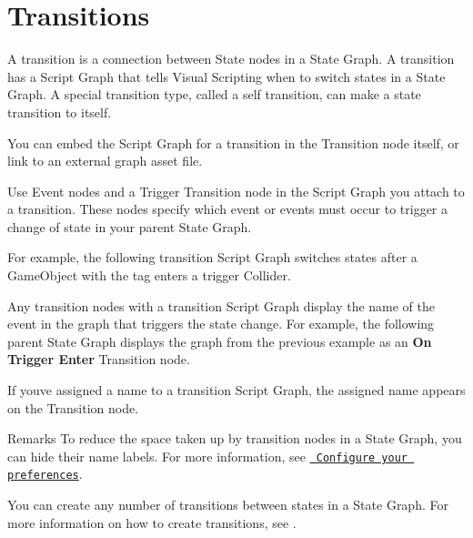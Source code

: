 \chapter{Transitions}
\hypertarget{md__hey_tea_9_2_library_2_package_cache_2com_8unity_8visualscripting_0d1_88_80_2_documentation_0i_2vs-transitions}{}\label{md__hey_tea_9_2_library_2_package_cache_2com_8unity_8visualscripting_0d1_88_80_2_documentation_0i_2vs-transitions}
\label{md__hey_tea_9_2_library_2_package_cache_2com_8unity_8visualscripting_0d1_88_80_2_documentation_0i_2vs-transitions_autotoc_md5612}%
%
 A transition is a connection between State nodes in a State Graph. A transition has a Script Graph that tells Visual Scripting when to switch states in a State Graph. A special transition type, called a self transition, can make a state transition to itself.

You can embed the Script Graph for a transition in the Transition node itself, or link to an external graph asset file.

Use Event nodes and a Trigger Transition node in the Script Graph you attach to a transition. These nodes specify which event or events must occur to trigger a change of state in your parent State Graph.

For example, the following transition Script Graph switches states after a Game\+Object with the  tag enters a trigger Collider.



Any transition nodes with a transition Script Graph display the name of the event in the graph that triggers the state change. For example, the following parent State Graph displays the graph from the previous example as an {\bfseries{On Trigger Enter}} Transition node.



If you\textquotesingle{}ve assigned a name to a transition Script Graph, the assigned name appears on the Transition node.

\begin{DoxyRemark}{Remarks}
To reduce the space taken up by transition nodes in a State Graph, you can hide their name labels. For more information, see \href{vs-set-preferences.md\#state-graphs-preferences}{\texttt{ Configure your preferences}}.
\end{DoxyRemark}
You can create any number of transitions between states in a State Graph. For more information on how to create transitions, see . 